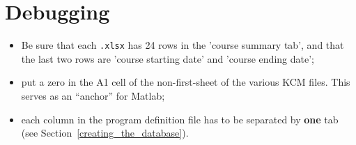 \section{Debugging}
\label{sec:debugging}

\begin{itemize}
	
	\item Be sure that each \texttt{.xlsx} has 24 rows in the 'course summary tab', and that the last two rows are 'course starting date' and 'course ending date';

	\item put a zero in the A1 cell of the non-first-sheet of the various \ac{KCM} files. This serves as an ``anchor'' for Matlab;

	\item each column in the program definition file has to be separated by \textbf{one} tab (see Section~\ref{creating_the_database}).

\end{itemize}


